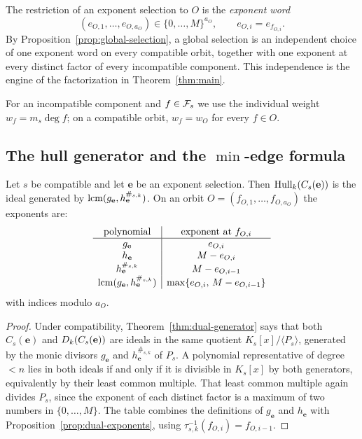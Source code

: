 The restriction of an exponent selection to $O$ is the \emph{exponent word}
\[
(e_{O,1},\ldots,e_{O,a_O})\in\{0,\ldots,M\}^{a_O},
\qquad e_{O,i}=e_{f_{O,i}} .
\]
By Proposition~\ref{prop:global-selection}, a global selection is an
independent choice of one exponent word on every compatible orbit, together
with one exponent at every distinct factor of every incompatible component.
This independence is the engine of the factorization in
Theorem~\ref{thm:main}.

For an incompatible component and $f\in\mathcal F_s$ we use the individual weight
$w_f=m_s\deg f$; on a compatible orbit, $w_f=w_O$ for every $f\in O$.

\subsection{The hull generator and the \texorpdfstring{$\min$}{min}-edge
formula}\label{sec:min-edge}

\begin{lemma}\label{lem:hull-generator}
Let $s$ be compatible and let $\mathbf{e}$ be an exponent selection.  Then
$\operatorname{Hull}_k(C_s(\mathbf{e}))$ is the ideal generated by
$\operatorname{lcm}(g_{\mathbf{e}},h_{\mathbf{e}}^{\#_{s,k}})$.  On an orbit
$O=(f_{O,1},\ldots,f_{O,a_O})$ the exponents are:
{\small
\[
\begin{array}{c|c}
\text{polynomial} & \text{exponent at }f_{O,i}\\ \hline
 g_{\mathbf{e}} & e_{O,i}\\
 h_{\mathbf{e}} & M-e_{O,i}\\
 h_{\mathbf{e}}^{\#_{s,k}} & M-e_{O,i-1}\\
 \operatorname{lcm}(g_{\mathbf{e}},h_{\mathbf{e}}^{\#_{s,k}}) &
   \max\{e_{O,i},\,M-e_{O,i-1}\}
\end{array}
\]
}
with indices modulo $a_O$.
\end{lemma}

\begin{proof}
Under compatibility, Theorem~\ref{thm:dual-generator} says that both
$C_s(\mathbf{e})$ and $D_k(C_s(\mathbf{e}))$ are ideals in the same quotient
$K_s[x]/\langle P_s\rangle$, generated by the monic divisors
$g_{\mathbf{e}}$ and $h_{\mathbf{e}}^{\#_{s,k}}$ of $P_s$.  A polynomial
representative of degree $<n$ lies in both ideals if and only if it is
divisible in $K_s[x]$ by both generators, equivalently by their least common
multiple.  That least common multiple again divides $P_s$, since the exponent
of each distinct factor is a maximum of two numbers in $\{0,\ldots,M\}$.  The
table combines the definitions of $g_{\mathbf{e}}$ and $h_{\mathbf{e}}$ with
Proposition~\ref{prop:dual-exponents}, using
$\tau_{s,k}^{-1}(f_{O,i})=f_{O,i-1}$.
\end{proof}


